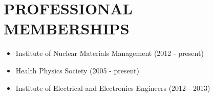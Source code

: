 \documentclass[paper=letter,fontsize=11pt]{scrartcl} %
\newcommand{\NewPart}[2]{\section*{\uppercase{#1} #2}}
\begin{document}
\NewPart{PROFESSIONAL MEMBERSHIPS}{}
\begin{itemize}
\item Institute of Nuclear Materials Management (2012 - present)
\item Health Physics Society (2005 - present)
\item Institute of Electrical and Electronics Engineers (2012 - 2013)
\end{itemize}
\end{document}
